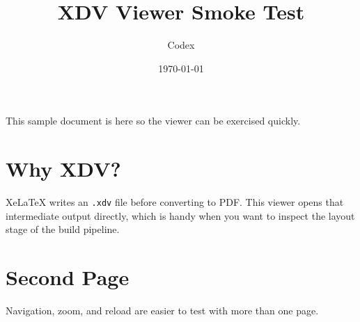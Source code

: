 \documentclass{article}
\title{XDV Viewer Smoke Test}
\author{Codex}
\date{\today}
\begin{document}
\maketitle

This sample document is here so the viewer can be exercised quickly.

\section*{Why XDV?}
XeLaTeX writes an \texttt{.xdv} file before converting to PDF. This viewer opens
that intermediate output directly, which is handy when you want to inspect the
layout stage of the build pipeline.

\newpage

\section*{Second Page}
Navigation, zoom, and reload are easier to test with more than one page.
\end{document}
